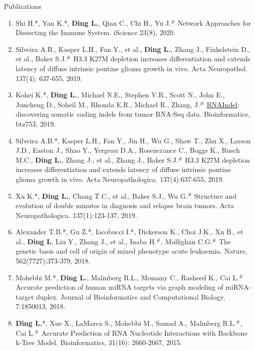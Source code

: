 \documentclass{resume} %
\begin{document}
\begin{rSection}{Publications}
\begin{enumerate}
\item Shi H.*, Yan K.*, \textbf{Ding L.}, Qian C., Chi H., Yu J.$^{\#}$ Network Approaches for Dissecting the Immune System. iScience 23(8), 2020.

\item Silveira A.B., Kasper L.H., Fan Y., et al., \textbf{Ding L.}, Zhang J., Finkelstein D., et al., Baker S.J.$^{\#}$ H3.3 K27M depletion increases differentiation and extends latency of diffuse intrinsic pontine glioma growth in vivo. Acta Neuropathol. 137(4): 637-655, 2019.

\item Kohei K.*, \textbf{Ding L.}, Michael N.E., Stephen V.R., Scott N., John E., Juncheng D., Soheil M., Rhonda E.R., Michael R., Zhang, J.$^{\#}$ \href{https://github.com/stjude/RNAIndel}{RNAIndel}: discovering somatic coding indels from tumor RNA-Seq data. Bioinformatics, btz753, 2019.

\item Silveira A.B.*, Kasper L.H., Fan Y., Jin H., Wu G., Shaw T., Zhu X., Larson J.D., Easton J., Shao Y., Yergeau D.A., Rosencrance C., Boggs K., Rusch M.C., \textbf{Ding L.}, Zhang J., et al., Zhang J., Baker S.J.$^{\#}$ H3.3 K27M depletion increases differentiation and extends latency of diffuse intrinsic pontine glioma growth in vivo. Acta Neuropathologica. 137(4):637-655, 2019.

\item Xu K.*, \textbf{Ding L.}, Chang T.C., et al., Baker S.J., Wu G.$^{\#}$ Structure and evolution of double minutes in diagnosis and relapse brain tumors. Acta Neuropathologica. 137(1):123-137, 2019.

\item Alexander T.B.*, Gu Z.*, Iacobucci I.*, Dickerson K., Choi J.K., Xu B., et al., \textbf{Ding L}, Liu Y., Zhang J., et al., Inaba H.$^{\#}$, Mullighan C.G.$^{\#}$ The genetic basis and cell of origin of mixed phenotype acute leukaemia. Nature, 562(7727):373-379, 2018.

\item Mohebbi M.*, \textbf{Ding L.}, Malmberg R.L., Momany C., Rasheed K., Cai L.$^{\#}$ Accurate prediction of human miRNA targets via graph modeling of miRNA-target duplex. Journal of Bioinformatics and Computational Biology, 7:1850013, 2018.

\item \textbf{Ding L.}*, Xue X., LaMarca S., Mohebbi M., Samad A., Malmberg R.L.$^{\#}$, Cai L.$^{\#}$ Accurate Prediction of RNA Nucleotide Interactions with Backbone k-Tree Model. Bioinformatics, 31(16): 2660-2667, 2015.
\end{enumerate}



\end{rSection}
\end{document}
